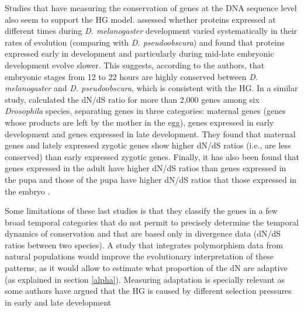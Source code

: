 Studies that have measuring the conservation of genes at the DNA sequence level also seem to support the HG model.
\citet{Davis2005} assessed whether proteins expressed at different times during \textit{D.  melanogaster} development varied systematically in their rates of evolution (comparing with \textit{D. pseudoobscura}) and found that proteins expressed early in development and particularly during mid-late embryonic development evolve slower.  
This suggests, according to the authors, that embryonic stages from 12 to 22 hours are
highly conserved between \textit{D. melanogaster} and \textit{D. pseudoobscura}, which is consistent with the HG.
%
In a similar study, \citet{Mensch2013} calculated the dN/dS ratio for more than 2,000 genes among six \textit{Drosophila} species, separating genes in three categories: maternal genes (genes whose products are left by the mother in the egg), genes expressed in early development and genes expressed in late development. They found that maternal genes and lately expressed zygotic genes show higher dN/dS ratios (i.e., are less conserved) than early expressed zygotic genes.
Finally, it has also been found that genes expressed in the adult have higher dN/dS ratios than genes expressed in the pupa and those of the pupa have higher dN/dS ratios that those expressed in the embryo \citep{Artieri2009}.

Some limitations of these last studies is that they classify the genes in a few broad temporal categories that do not permit to precisely determine the temporal dynamics of conservation and that are based only in divergence data (dN/dS ratios between two species).
A study that integrates polymorphism data from natural populations would improve the evolutionary interpretation of these patterns, as it would allow to estimate what proportion of the dN are adaptive (as explained in section \ref{alpha}).
Measuring adaptation is specially relevant as some authors have argued that the HG is caused by different selection pressures in early and late development \citep{Slack1993,Kalinka2012,Wray2000}


